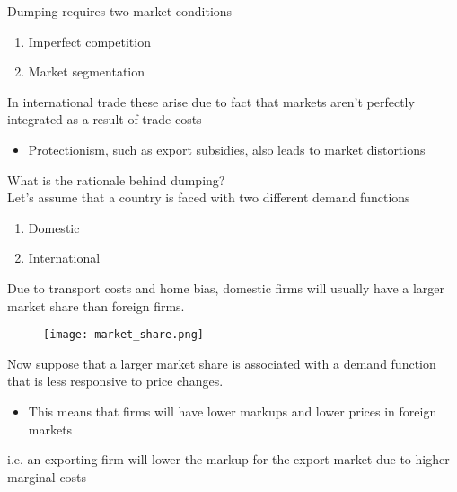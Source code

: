 \documentclass{beamer}
\begin{document}
\begin{frame}
  Dumping requires two market conditions
  \begin{enumerate}
    \item Imperfect competition
    \item Market segmentation
  \end{enumerate}
  \medskip
  In international trade these arise due to fact that markets aren't perfectly integrated as a result of trade costs
  \begin{itemize}
    \item Protectionism, such as export subsidies, also leads to market distortions
  \end{itemize}
\end{frame}

\begin{frame}
  What is the rationale behind dumping?\\
  Let's assume that a country is faced with two different demand functions
  \begin{enumerate}
    \item Domestic 
    \item International
  \end{enumerate}
  \medskip
  Due to transport costs and home bias, domestic firms will usually have a larger market share than foreign firms.  
\end{frame}

\begin{frame}
  \begin{figure}
    \texttt{[image: market\_share.png]}
  \end{figure}
\end{frame}

\begin{frame}
Now suppose that a larger market share is associated with a demand function that is less responsive to price changes.
  \begin{itemize}
    \item This means that firms will have lower markups and lower prices in foreign markets    
  \end{itemize}  
  \medskip
  i.e. an exporting firm will lower the markup for the export market due to higher marginal costs
\end{frame}
\end{document}
